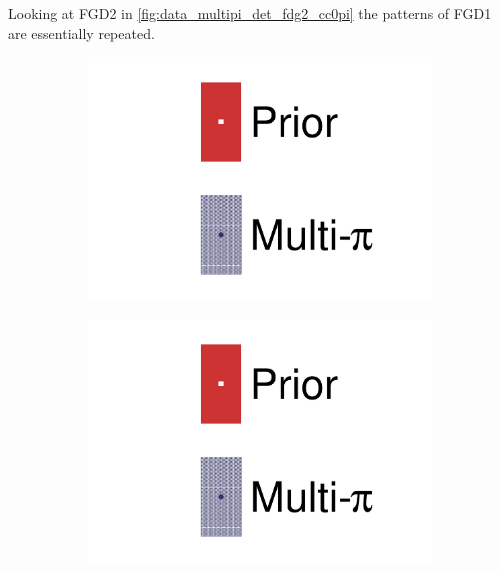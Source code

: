 Looking at FGD2 in \autoref{fig:data_multipi_det_fdg2_cc0pi} the patterns of FGD1 are essentially repeated.
\begin{figure}[h]
	\centering
	\begin{subfigure}[t]{0.1\textwidth}
		\includegraphics[width=\textwidth,page=1, trim={0mm 120mm 40mm 20mm}, clip]{figures/mach3/2018/data/2018a_FixedCov_RedCov_Mpi_Data_merge_drawPar_withDet}
	\end{subfigure}
	\begin{subfigure}[t]{0.1\textwidth}
		\includegraphics[width=\textwidth,page=1, trim={0mm 20mm 40mm 120mm}, clip]{figures/mach3/2018/data/2018a_FixedCov_RedCov_Mpi_Data_merge_drawPar_withDet}
	\end{subfigure}


\end{figure}
